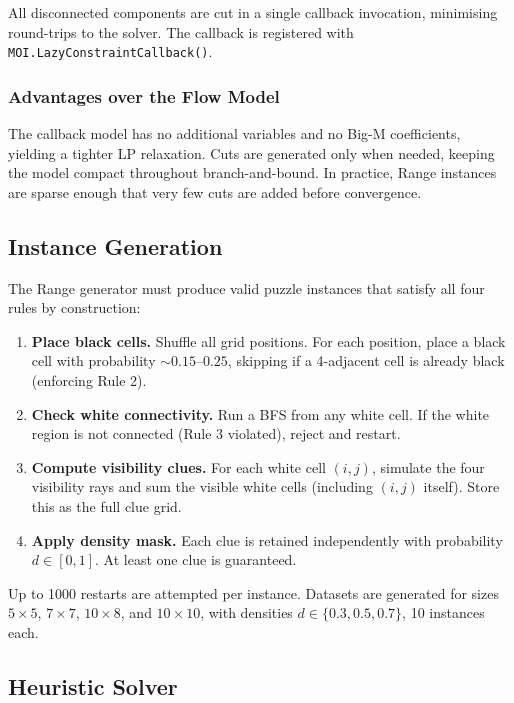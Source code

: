 All disconnected components are cut in a single callback invocation, minimising round-trips to the solver. The callback is registered with \texttt{MOI.LazyConstraintCallback()}.

\subsubsection{Advantages over the Flow Model}

The callback model has no additional variables and no Big-M coefficients, yielding a tighter LP relaxation. Cuts are generated only when needed, keeping the model compact throughout branch-and-bound. In practice, Range instances are sparse enough that very few cuts are added before convergence.

\subsection{Instance Generation}

The Range generator must produce valid puzzle instances that satisfy all four rules by construction:

\begin{enumerate}
  \item \textbf{Place black cells.} Shuffle all grid positions. For each position, place a black cell with probability $\sim 0.15$–$0.25$, skipping if a 4-adjacent cell is already black (enforcing Rule 2).
  \item \textbf{Check white connectivity.} Run a BFS from any white cell. If the white region is not connected (Rule 3 violated), reject and restart.
  \item \textbf{Compute visibility clues.} For each white cell $(i,j)$, simulate the four visibility rays and sum the visible white cells (including $(i,j)$ itself). Store this as the full clue grid.
  \item \textbf{Apply density mask.} Each clue is retained independently with probability $d \in [0,1]$. At least one clue is guaranteed.
\end{enumerate}

Up to 1000 restarts are attempted per instance. Datasets are generated for sizes $5 \times 5$, $7 \times 7$, $10 \times 8$, and $10 \times 10$, with densities $d \in \{0.3, 0.5, 0.7\}$, 10 instances each.

\subsection{Heuristic Solver}

